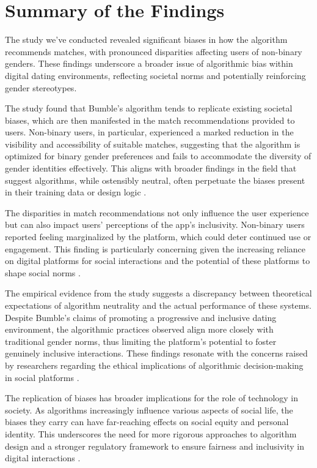 \section{Summary of the Findings}
The study we've conducted revealed significant biases in how the algorithm recommends matches, with pronounced disparities affecting users of non-binary genders. These findings underscore a broader issue of algorithmic bias within digital dating environments, reflecting societal norms and potentially reinforcing gender stereotypes.

The study found that Bumble's algorithm tends to replicate existing societal biases, which are then manifested in the match recommendations provided to users. Non-binary users, in particular, experienced a marked reduction in the visibility and accessibility of suitable matches, suggesting that the algorithm is optimized for binary gender preferences and fails to accommodate the diversity of gender identities effectively. This aligns with broader findings in the field that suggest algorithms, while ostensibly neutral, often perpetuate the biases present in their training data or design logic \cite{davidson-etal-2019-racial,Selbst_Boyd_Friedler_Venkatasubramanian_Vertesi_2019}.

The disparities in match recommendations not only influence the user experience but can also impact users' perceptions of the app's inclusivity. Non-binary users reported feeling marginalized by the platform, which could deter continued use or engagement. This finding is particularly concerning given the increasing reliance on digital platforms for social interactions and the potential of these platforms to shape social norms \cite{MacLeod_McArthur_2019}.

The empirical evidence from the study suggests a discrepancy between theoretical expectations of algorithm neutrality and the actual performance of these systems. Despite Bumble's claims of promoting a progressive and inclusive dating environment, the algorithmic practices observed align more closely with traditional gender norms, thus limiting the platform's potential to foster genuinely inclusive interactions. These findings resonate with the concerns raised by researchers regarding the ethical implications of algorithmic decision-making in social platforms \cite{Hutson_Taft_Barocas_Levy_2018}.

The replication of biases has broader implications for the role of technology in society. As algorithms increasingly influence various aspects of social life, the biases they carry can have far-reaching effects on social equity and personal identity. This underscores the need for more rigorous approaches to algorithm design and a stronger regulatory framework to ensure fairness and inclusivity in digital interactions \cite{Lambrecht_Tucker_2019}.

